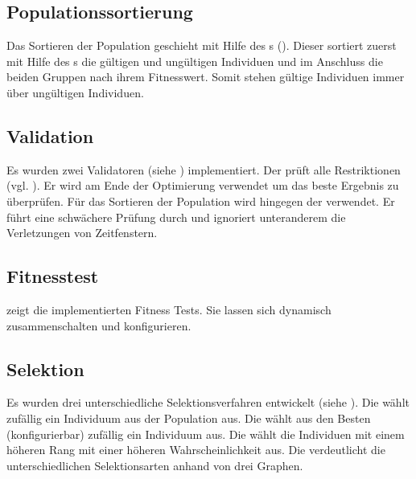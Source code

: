 \newpage
\subsection{Populationssortierung}
Das Sortieren der Population geschieht mit Hilfe des s (). Dieser sortiert zuerst mit Hilfe des s die gültigen und ungültigen Individuen und im Anschluss die beiden Gruppen nach ihrem Fitnesswert. Somit stehen gültige Individuen immer über ungültigen Individuen.

\subsection{Validation}
Es wurden zwei Validatoren (siehe ) implementiert. Der  prüft alle Restriktionen (vgl. ). Er wird am Ende der Optimierung verwendet um das beste Ergebnis zu überprüfen. Für das Sortieren der Population wird hingegen der  verwendet. Er führt eine schwächere Prüfung durch und ignoriert unteranderem die Verletzungen von Zeitfenstern.

\newpage
\subsection{Fitnesstest}
 zeigt die implementierten Fitness Tests. Sie lassen sich dynamisch zusammenschalten und konfigurieren.

\subsection{Selektion}
Es wurden drei unterschiedliche Selektionsverfahren entwickelt (siehe ). Die  wählt zufällig ein Individuum aus der Population aus. Die  wählt aus den Besten (konfigurierbar) zufällig ein Individuum aus. Die  wählt die Individuen mit einem höheren Rang mit einer höheren Wahrscheinlichkeit aus. Die  verdeutlicht die unterschiedlichen Selektionsarten anhand von drei Graphen.

